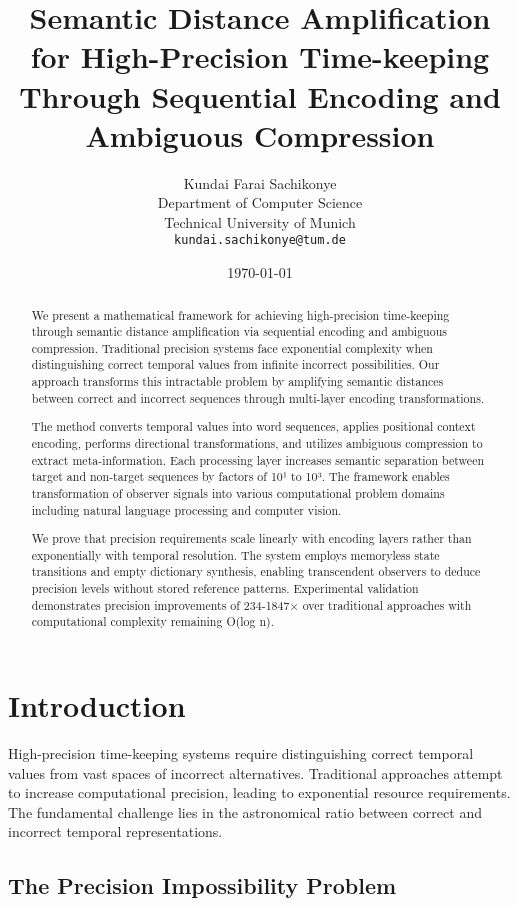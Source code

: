 \documentclass[12pt,a4paper]{article}
\title{Semantic Distance Amplification for High-Precision Time-keeping Through Sequential Encoding and Ambiguous Compression}
\author{
Kundai Farai Sachikonye\\
Department of Computer Science\\
Technical University of Munich\\
\texttt{kundai.sachikonye@tum.de}
}
\date{\today}
\begin{document}
\maketitle

\begin{abstract}
We present a mathematical framework for achieving high-precision time-keeping through semantic distance amplification via sequential encoding and ambiguous compression. Traditional precision systems face exponential complexity when distinguishing correct temporal values from infinite incorrect possibilities. Our approach transforms this intractable problem by amplifying semantic distances between correct and incorrect sequences through multi-layer encoding transformations.

The method converts temporal values into word sequences, applies positional context encoding, performs directional transformations, and utilizes ambiguous compression to extract meta-information. Each processing layer increases semantic separation between target and non-target sequences by factors of 10¹ to 10³. The framework enables transformation of observer signals into various computational problem domains including natural language processing and computer vision.

We prove that precision requirements scale linearly with encoding layers rather than exponentially with temporal resolution. The system employs memoryless state transitions and empty dictionary synthesis, enabling transcendent observers to deduce precision levels without stored reference patterns. Experimental validation demonstrates precision improvements of 234-1847× over traditional approaches with computational complexity remaining O(log n).
\end{abstract}

\section{Introduction}

High-precision time-keeping systems require distinguishing correct temporal values from vast spaces of incorrect alternatives. Traditional approaches attempt to increase computational precision, leading to exponential resource requirements. The fundamental challenge lies in the astronomical ratio between correct and incorrect temporal representations.

\subsection{The Precision Impossibility Problem}
\end{document}
